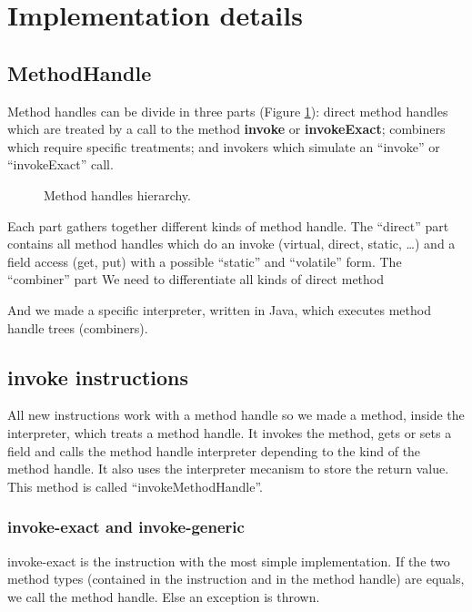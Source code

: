 \documentclass{sig-alternate}
\begin{document}
\section{Implementation details}
\label{implD}

    \subsection{MethodHandle}
      Method handles can be divide in three parts (Figure \ref{mhHier}):
      direct method handles which are treated by a call to the method {\bf invoke} or {\bf invokeExact};
      combiners which require specific treatments;
      and invokers which simulate an ``invoke'' or ``invokeExact'' call.

      \begin{figure}[!h]
        \centering \resizebox{.7\linewidth}{!}{}
        \caption{Method handles hierarchy.}
        \label{mhHier}
      \end{figure}

      Each part gathers together different kinds of method handle.
      The ``direct'' part contains all method handles which do an invoke (virtual, direct, static, \dots)
      and a field access (get, put) with a possible ``static'' and ``volatile'' form.
      The ``combiner'' part
      We need to differentiate all kinds of direct method

      And we made a specific interpreter, written in Java, which executes method handle trees (combiners).

    \subsection{invoke instructions}
      All new instructions work with a method handle so we made a method, inside the interpreter, which treats a method handle.
      It invokes the method, gets or sets a field and calls the method handle interpreter depending to the kind of the method handle.
      It also uses the interpreter mecanism to store the return value.
      This method is called ``invokeMethodHandle''.

    \subsubsection{invoke-exact and invoke-generic}
      invoke-exact is the instruction with the most simple implementation.
      If the two method types (contained in the instruction and in the method handle) are equals, we call the method handle.
      Else an exception is thrown.\\
      
\end{document}
